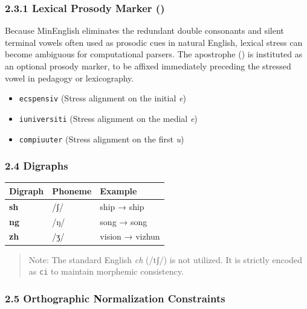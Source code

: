 \subsubsection{\texorpdfstring{2.3.1 Lexical Prosody Marker
(\texttt{\textquotesingle{}})}{2.3.1 Lexical Prosody Marker (\textquotesingle)}}\label{lexical-prosody-marker}

Because MinEnglish eliminates the redundant double consonants and silent
terminal vowels often used as prosodic cues in natural English, lexical
stress can become ambiguous for computational parsers. The apostrophe
(\texttt{\textquotesingle{}}) is instituted as an optional prosody
marker, to be affixed immediately preceding the stressed vowel in
pedagogy or lexicography.

\begin{itemize}
\tightlist
\item
  \texttt{ecsp\textquotesingle{}ensiv} (Stress alignment on the initial
  \emph{e})
\item
  \texttt{iuniv\textquotesingle{}ersiti} (Stress alignment on the medial
  \emph{e})
\item
  \texttt{compi\textquotesingle{}uuter} (Stress alignment on the first
  \emph{u})
\end{itemize}

\subsubsection{2.4 Digraphs}\label{digraphs}

{\def\LTcaptype{} %
\begin{longtable}[]{@{}lll@{}}
\toprule\noalign{}
Digraph & Phoneme & Example \\
\midrule\noalign{}
\endhead
\bottomrule\noalign{}
\endlastfoot
\textbf{sh} & /ʃ/ & ship → ship \\
\textbf{ng} & /ŋ/ & song → song \\
\textbf{zh} & /ʒ/ & vision → vizhun \\
\end{longtable}
}

\begin{quote}
Note: The standard English \emph{ch} (/tʃ/) is not utilized. It is
strictly encoded as \texttt{ci} to maintain morphemic consistency.
\end{quote}

\subsubsection{2.5 Orthographic Normalization
Constraints}\label{orthographic-normalization-constraints}

